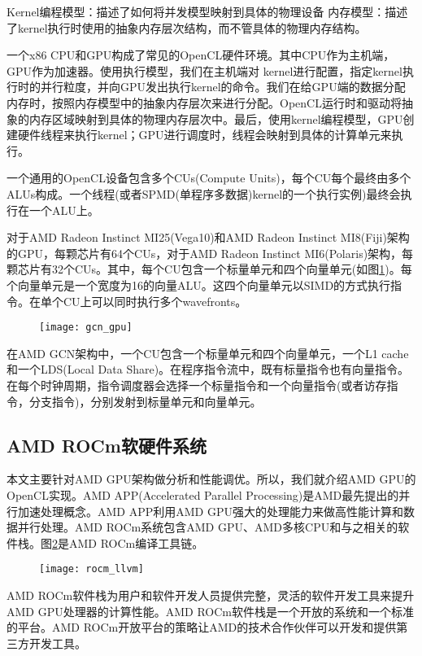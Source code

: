 Kernel编程模型：描述了如何将并发模型映射到具体的物理设备
内存模型：描述了kernel执行时使用的抽象内存层次结构，而不管具体的物理内存结构。

一个x86 CPU和GPU构成了常见的OpenCL硬件环境。其中CPU作为主机端，GPU作为加速器。使用执行模型，我们在主机端对 kernel进行配置，指定kernel执行时的并行粒度，并向GPU发出执行kernel的命令。我们在给GPU端的数据分配内存时，按照内存模型中的抽象内存层次来进行分配。OpenCL运行时和驱动将抽象的内存区域映射到具体的物理内存层次中。最后，使用kernel编程模型，GPU创建硬件线程来执行kernel；GPU进行调度时，线程会映射到具体的计算单元来执行。

一个通用的OpenCL设备包含多个CUs(Compute Units)，每个CU每个最终由多个ALUs构成。一个线程(或者SPMD(单程序多数据)kernel的一个执行实例)最终会执行在一个ALU上。

对于AMD Radeon Instinct MI25(Vega10)和AMD Radeon Instinct MI8(Fiji)架构的GPU，每颗芯片有64个CUs，对于AMD Radeon Instinct MI6(Polaris)架构，每颗芯片有32个CUs。其中，每个CU包含一个标量单元和四个向量单元(如图\ref{fig:gcn_gpu})。每个向量单元是一个宽度为16的向量ALU。这四个向量单元以SIMD的方式执行指令。在单个CU上可以同时执行多个wavefronts。
\begin{figure}[htbp]
	\centering
	\texttt{[image: gcn\_gpu]}
	\label{fig:gcn_gpu}
\end{figure}
在AMD GCN架构中，一个CU包含一个标量单元和四个向量单元，一个L1 cache和一个LDS(Local Data Share)。在程序指令流中，既有标量指令也有向量指令。在每个时钟周期，指令调度器会选择一个标量指令和一个向量指令(或者访存指令，分支指令)，分别发射到标量单元和向量单元。


\subsection{AMD ROCm软硬件系统}
本文主要针对AMD GPU架构做分析和性能调优。所以，我们就介绍AMD GPU的OpenCL实现。AMD APP(Accelerated Parallel Processing)是AMD最先提出的并行加速处理概念。AMD APP利用AMD GPU强大的处理能力来做高性能计算和数据并行处理。AMD ROCm系统包含AMD GPU、AMD多核CPU和与之相关的软件栈。图\ref{fig:rocm_llvm}是AMD ROCm编译工具链。
\begin{figure}[htbp]
	\centering
	\texttt{[image: rocm\_llvm]}
	\label{fig:rocm_llvm}
\end{figure}

AMD ROCm软件栈为用户和软件开发人员提供完整，灵活的软件开发工具来提升AMD GPU处理器的计算性能。AMD ROCm软件栈是一个开放的系统和一个标准的平台。AMD ROCm开放平台的策略让AMD的技术合作伙伴可以开发和提供第三方开发工具。

